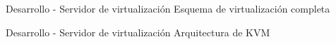 \begin{frame}{Desarrollo - Servidor de virtualización}
    \vspace{0cm} {Esquema de virtualización completa}
    \vspace{0.5cm}
    \begin{figure}[ht]
       \centering
       \vspace{-0.50cm}
    \end{figure}

\end{frame}

\begin{frame}{Desarrollo - Servidor de virtualización}
    \vspace{0cm} {Arquitectura de KVM}
    \vspace{0.5cm}
    \begin{figure}[ht]
       \raggedright
       \vspace{-0.50cm} 
    \end{figure}

\end{frame}

